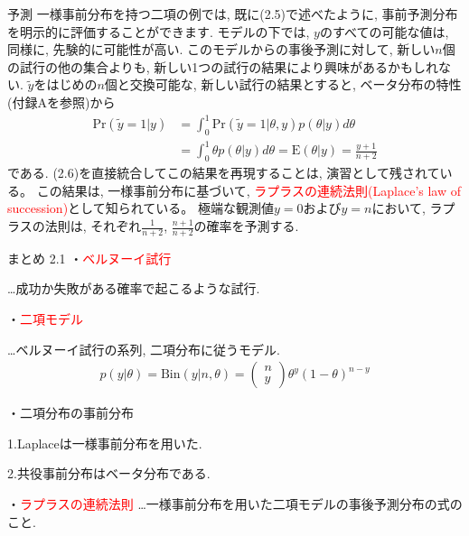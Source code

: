 \documentclass[10pt,dvipdfmx,a4]{beamer}
\newcommand{\eq}[1]{\begin{align}#1\end{align}}
\newcommand{\eqn}[1]{\begin{align*}#1\end{align*}}
\newcommand{\tcr}[1]{\textcolor{red}{#1}}
\begin{document}
\begin{frame}{予測}
一様事前分布を持つ二項の例では, 既に(2.5)で述べたように, 事前予測分布を明示的に評価することができます.
モデルの下では, $y$のすべての可能な値は, 同様に, 先験的に可能性が高い.
このモデルからの事後予測に対して, 新しい$n$個の試行の他の集合よりも, 新しい1つの試行の結果により興味があるかもしれない.
$\tilde{y}$をはじめの$n$個と交換可能な, 新しい試行の結果とすると, ベータ分布の特性(付録Aを参照)から
\eq{\text{Pr}(\tilde{y}=1|y)&=\int_0^1 \text{Pr}(\tilde{y}=1|\theta,y)p(\theta|y)d\theta\nonumber \\
&=\int_0^1 \theta p(\theta|y)d\theta=\text{E}(\theta|y)=\frac{y+1}{n+2}}
である.
(2.6)を直接統合してこの結果を再現することは, 演習として残されている。
この結果は, 一様事前分布に基づいて, \tcr{ラプラスの連続法則(Laplace's law of succession)}として知られている。
極端な観測値$y=0$および$y=n$において, ラプラスの法則は, それぞれ$\tfrac{1}{n+2}$, $\tfrac{n+1}{n+2}$の確率を予測する.
\end{frame}


\begin{frame}{まとめ 2.1}
・\tcr{ベルヌーイ試行}

…成功か失敗がある確率で起こるような試行.

・\tcr{二項モデル}

…ベルヌーイ試行の系列, 二項分布に従うモデル.
\eqn{p(y|\theta)=\text{Bin}(y|n,\theta)=\left(\begin{array}{c}n\\y\end{array}\right)\theta^y(1-\theta)^{n-y}}

・二項分布の事前分布

1.Laplaceは一様事前分布を用いた.

2.共役事前分布はベータ分布である.

・\tcr{ラプラスの連続法則}
…一様事前分布を用いた二項モデルの事後予測分布の式のこと.
\end{frame}

\end{document}
